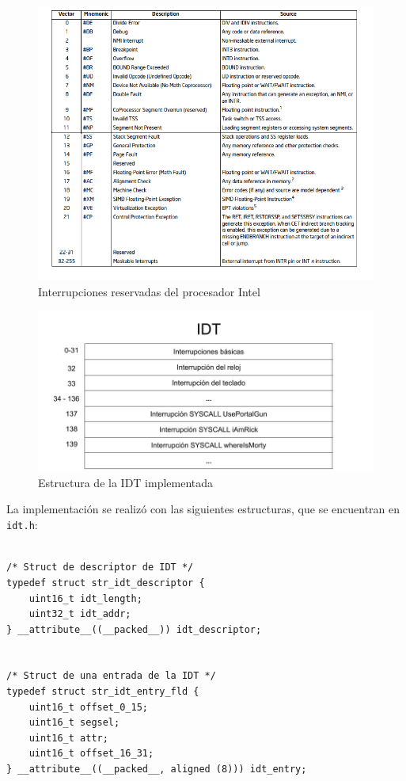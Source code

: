 \documentclass[a4paper]{article}
\newenvironment{codesnippet}{%
	\begin{Sbox}\begin{minipage}{\textwidth}\sffamily\small}%
	{\end{minipage}\end{Sbox}%
		\begin{center}%
		\vspace{-0.4cm}\colorbox{litegrey}{\TheSbox}\end{center}\vspace{0.3cm}}
\begin{document}
\begin{figure}[!htb]
  \begin{center}
	\includegraphics[scale=0.6]{img/idt.png}
	\caption{Interrupciones reservadas del procesador Intel}
  \end{center}
\end{figure}

\begin{figure}[!htb]
  \begin{center}
	\includegraphics[scale=0.3]{img/IDTfinal.jpg}
	\caption{Estructura de la IDT implementada}
  \end{center}
\end{figure}

La implementación se realizó con las siguientes estructuras, que se encuentran en {\tt idt.h}:

\begin{codesnippet}
\begin{verbatim}

/* Struct de descriptor de IDT */
typedef struct str_idt_descriptor {
    uint16_t idt_length;
    uint32_t idt_addr;
} __attribute__((__packed__)) idt_descriptor;


/* Struct de una entrada de la IDT */
typedef struct str_idt_entry_fld {
    uint16_t offset_0_15;
    uint16_t segsel;
    uint16_t attr;
    uint16_t offset_16_31;
} __attribute__((__packed__, aligned (8))) idt_entry;

\end{verbatim}
\end{codesnippet}
\end{document}
